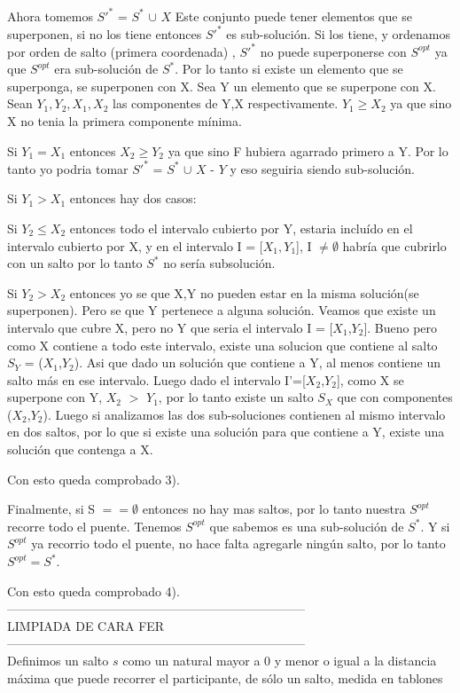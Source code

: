 Ahora tomemos $S'^{*}$ = $S^{*}$ $\cup$ ${X}$
Este conjunto puede tener elementos que se superponen, si no los tiene entonces 
$S'^{*}$ es sub-soluci\'on.
Si los tiene, y ordenamos por orden de salto (primera coordenada) , $S'^{*}$ no puede superponerse con $S^{opt}$ ya que $S^{opt}$ era sub-soluci\'on de $S^{*}$.
Por lo tanto si existe un elemento que se superponga, se superponen con X.
Sea Y un elemento que se superpone con X.
Sean $Y_{1},Y_{2},X_{1},X_{2}$ las componentes de Y,X respectivamente.
$Y_{1}\geq X_{2}$ ya que sino X no tenia la primera componente m\'inima.

Si $Y_{1} = X_{1}$ entonces $X_{2} \geq Y_{2}$ ya que sino F hubiera agarrado primero a Y. Por lo tanto yo podria tomar $S'^{*}$ = $S^{*}$ $\cup$ ${X}$ - ${Y}$ y eso seguiria siendo sub-soluci\'on.

Si $Y_{1} > X_{1}$ entonces hay dos casos:

Si $Y_{2} \leq X_{2}$ entonces todo el intervalo cubierto por Y, estaria inclu\'ido en el intervalo cubierto por X, y en el intervalo I = [$X_{1},Y_{1}$], I $\neq \emptyset$ habr\'ia que cubrirlo con un salto por lo tanto $S^{*}$ no ser\'ia subsoluci\'on.

Si $Y_{2} > X_{2}$ entonces yo se que X,Y no pueden estar en la misma soluci\'on(se superponen). Pero se que Y pertenece a alguna soluci\'on. Veamos que existe un intervalo que cubre X, pero no Y que seria el intervalo I = [$X_{1}$,$Y_{2}$].
Bueno pero como X contiene a todo este intervalo, existe una solucion que contiene al salto $S_{Y}$ = ($X_{1}$,$Y_{2}$). Asi que dado un soluci\'on que contiene a Y, al menos contiene un salto m\'as en ese intervalo.
Luego dado el intervalo I'=[$X_{2}$,$Y_{2}$], como X se superpone con Y, $X_{2}$ $>$ $Y_{1}$, por lo tanto existe un salto $S_{X}$ que con componentes ($X_{2}$,$Y_{2}$).
Luego si analizamos las dos sub-soluciones contienen al mismo intervalo en dos saltos, por lo que si existe una soluci\'on para que contiene a Y, existe una soluci\'on que contenga a X. 

Con esto queda comprobado 3).

Finalmente, si S $== \emptyset$ entonces no hay mas saltos, por lo tanto nuestra $S^{opt}$ recorre todo el puente.
Tenemos $S^{opt}$  que sabemos es una sub-soluci\'on de $S^{*}$. Y si $S^{opt}$ ya recorrio todo el puente, no hace falta agregarle ning\'un salto, por lo tanto $S^{opt} =S^{*}$.  

Con esto queda comprobado 4).
\\
------------------------------------------------------------------------\\
LIMPIADA DE CARA FER\\
------------------------------------------------------------------------\\
Definimos un salto $s$ como un natural mayor a 0 y menor o igual a la distancia 
máxima que puede recorrer el participante, de sólo un salto, medida en tablones


